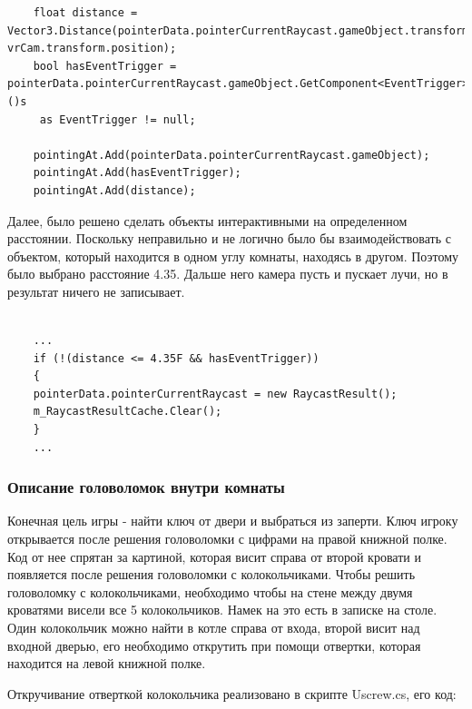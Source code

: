 \begin{small}
    \begin{verbatim}
    float distance = Vector3.Distance(pointerData.pointerCurrentRaycast.gameObject.transform.position, vrCam.transform.position);
    bool hasEventTrigger = pointerData.pointerCurrentRaycast.gameObject.GetComponent<EventTrigger>()s
     as EventTrigger != null;
    
    pointingAt.Add(pointerData.pointerCurrentRaycast.gameObject);
    pointingAt.Add(hasEventTrigger);
    pointingAt.Add(distance);
    \end{verbatim}
\end{small}

Далее, было решено сделать объекты интерактивными на определенном расстоянии. Поскольку неправильно и не логично было бы взаимодействовать с объектом, который находится в одном углу комнаты, находясь в другом. Поэтому было выбрано расстояние 4.35. Дальше него камера пусть и пускает лучи, но в результат ничего не записывает. 

\begin{small}
    \begin{verbatim}
    
    ...
    if (!(distance <= 4.35F && hasEventTrigger))
    {
    pointerData.pointerCurrentRaycast = new RaycastResult();
    m_RaycastResultCache.Clear();
    }
    ...
    \end{verbatim}
\end{small}


\subsubsection{Описание головоломок внутри комнаты}
\tab[0.75cm]Конечная цель игры - найти ключ от двери и выбраться из заперти. Ключ игроку открывается после решения головоломки с цифрами на правой книжной полке. Код от нее спрятан за картиной, которая висит справа от второй кровати и появляется после решения головоломки с колокольчиками. Чтобы решить головоломку с колокольчиками, необходимо чтобы на стене между двумя кроватями висели все 5 колокольчиков. Намек на это есть в записке на столе. Один колокольчик можно найти в котле справа от входа, второй висит над входной дверью, его необходимо открутить при помощи отвертки, которая находится на левой книжной полке. 

Откручивание отверткой колокольчика реализовано в скрипте Uscrew.cs, его код:


